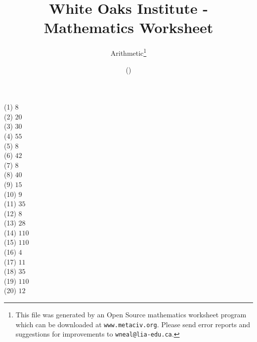 \documentclass[letter]{article}
\begin{document}
\title{White Oaks Institute - Mathematics Worksheet}
\author{Arithmetic\thanks{This file was generated by an \textsf{Open Source} mathematics worksheet program which can be downloaded at \texttt{www.metaciv.org}. Please send error reports and suggestions for improvements to \texttt{wneal@lia-edu.ca}.}}
\date{\XCfileversion{} (\XCfiledate)}
\maketitle
\setlength{\parskip}{12mm plus 4mm minus 4mm}\setlength{\parindent}{0cm}\begin{multicols}{2}(1) $8$\\(2) $20$\\(3) $30$\\(4) $55$\\(5) $8$\\(6) $42$\\(7) $8$\\(8) $40$\\(9) $15$\\(10) $9$\\(11) $35$\\(12) $8$\\(13) $28$\\(14) $110$\\(15) $110$\\(16) $4$\\(17) $11$\\(18) $35$\\(19) $110$\\(20) $12$\\\end{multicols}
\end{document}
